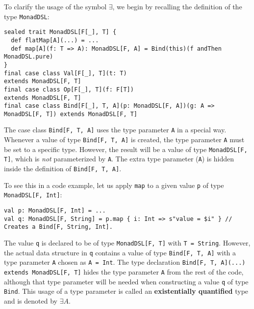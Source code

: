 To clarify the usage of the symbol $\exists$, we begin by recalling
the definition of the type \lstinline!MonadDSL!:
\begin{lstlisting}
sealed trait MonadDSL[F[_], T] {
  def flatMap[A](...) = ...
  def map[A](f: T => A): MonadDSL[F, A] = Bind(this)(f andThen MonadDSL.pure)
}
final case class Val[F[_], T](t: T)                                          extends MonadDSL[F, T]
final case class Op[F[_], T](f: F[T])                                        extends MonadDSL[F, T]
final case class Bind[F[_], T, A](p: MonadDSL[F, A])(g: A => MonadDSL[F, T]) extends MonadDSL[F, T]
\end{lstlisting}
The case class \lstinline!Bind[F, T, A]!
uses the type parameter \lstinline!A!
in a special way. Whenever a value of type \lstinline!Bind[F, T, A]!
is created, the type parameter \lstinline!A!
must be set to a specific type. However, the result will be a value
of type \lstinline!MonadDSL[F, T]!,
which is \emph{not} parameterized by \lstinline!A!.
The extra type parameter (\lstinline!A!)
is hidden inside the definition of \lstinline!Bind[F, T, A]!.

To see this in a code example, let us apply \lstinline!map!
to a given value \lstinline!p!
of type \lstinline!MonadDSL[F, Int]!:
\begin{lstlisting}
val p: MonadDSL[F, Int] = ...
val q: MonadDSL[F, String] = p.map { i: Int => s"value = $i" } // Creates a Bind[F, String, Int].
\end{lstlisting}
The value \lstinline!q!
is declared to be of type \lstinline!MonadDSL[F, T]!
with \lstinline!T = String!.
However, the actual data structure in \lstinline!q!
contains a value of type \lstinline!Bind[F, T, A]!
with a type parameter \lstinline!A!
chosen as \lstinline!A = Int!.
The type declaration \lstinline!Bind[F, T, A](...) extends MonadDSL[F, T]!
hides the type parameter \lstinline!A!
from the rest of the code, although that type parameter will be needed
when constructing a value \lstinline!q!
of type \lstinline!Bind!.
This usage of a type parameter is called an \textbf{existentially
quantified} type and is denoted by $\exists A$.

